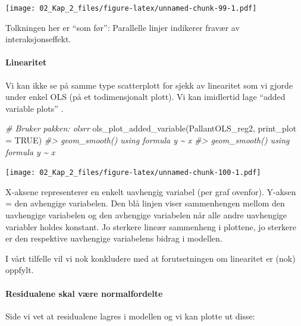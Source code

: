 \documentclass[
]{article}
\newenvironment{Shaded}{\begin{snugshade}}{\end{snugshade}}
\newcommand{\AttributeTok}[1]{\textcolor[rgb]{0.77,0.63,0.00}{#1}}
\newcommand{\CommentTok}[1]{\textcolor[rgb]{0.56,0.35,0.01}{\textit{#1}}}
\newcommand{\ConstantTok}[1]{\textcolor[rgb]{0.00,0.00,0.00}{#1}}
\newcommand{\FunctionTok}[1]{\textcolor[rgb]{0.00,0.00,0.00}{#1}}
\newcommand{\NormalTok}[1]{#1}
\begin{document}
\texttt{[image: 02\_Kap\_2\_files/figure-latex/unnamed-chunk-99-1.pdf]}

Tolkningen her er ``som før'': Parallelle linjer indikerer fravær av interaksjonseffekt.

\hypertarget{linearitet-1}{%
\paragraph{Linearitet}\label{linearitet-1}}

Vi kan ikke se på samme type scatterplott for sjekk av linearitet som vi gjorde under enkel OLS (på et todimensjonalt plott). Vi kan imidlertid lage ``added variable plots'' \citep{mostellerDataAnalysisRegression1977}.

\begin{Shaded}
\begin{Highlighting}[]
\CommentTok{\# Bruker pakken: olsrr}
\FunctionTok{ols\_plot\_added\_variable}\NormalTok{(PallantOLS\_reg2, }\AttributeTok{print\_plot =} \ConstantTok{TRUE}\NormalTok{)}
\CommentTok{\#\textgreater{} \textasciigrave{}geom\_smooth()\textasciigrave{} using formula \textquotesingle{}y \textasciitilde{} x\textquotesingle{}}
\CommentTok{\#\textgreater{} \textasciigrave{}geom\_smooth()\textasciigrave{} using formula \textquotesingle{}y \textasciitilde{} x\textquotesingle{}}
\end{Highlighting}
\end{Shaded}

\texttt{[image: 02\_Kap\_2\_files/figure-latex/unnamed-chunk-100-1.pdf]}

X-aksene representerer en enkelt uavhengig variabel (per graf ovenfor). Y-aksen = den avhengige variabelen. Den blå linjen viser sammenhengen mellom den uavhengige variabelen og den avhengige variabelen når alle andre uavhengige variabler holdes konstant. Jo sterkere lineær sammenheng i plottene, jo sterkere er den respektive uavhengige variabelens bidrag i modellen.

I vårt tilfelle vil vi nok konkludere med at forutsetningen om linearitet er (nok) oppfylt.

\hypertarget{residualene-skal-vuxe6re-normalfordelte-1}{%
\paragraph{Residualene skal være normalfordelte}\label{residualene-skal-vuxe6re-normalfordelte-1}}

Side vi vet at residualene lagres i modellen og vi kan plotte ut disse:
\end{document}
